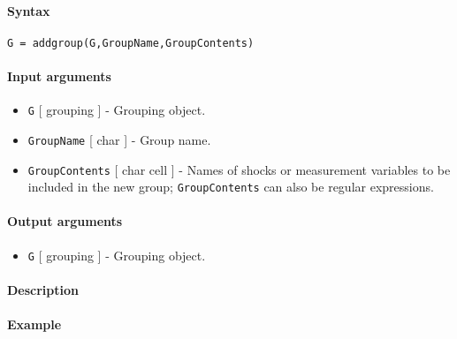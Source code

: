 


	\paragraph{Syntax}\label{syntax}

\begin{verbatim}
G = addgroup(G,GroupName,GroupContents)
\end{verbatim}

\paragraph{Input arguments}\label{input-arguments}

\begin{itemize}
\item
  \texttt{G} {[} grouping {]} - Grouping object.
\item
  \texttt{GroupName} {[} char {]} - Group name.
\item
  \texttt{GroupContents} {[} char \textbar{} cell {]} - Names of shocks
  or measurement variables to be included in the new group;
  \texttt{GroupContents} can also be regular expressions.
\end{itemize}

\paragraph{Output arguments}\label{output-arguments}

\begin{itemize}
\itemsep1pt\parskip0pt
\item
  \texttt{G} {[} grouping {]} - Grouping object.
\end{itemize}

\paragraph{Description}\label{description}

\paragraph{Example}\label{example}


